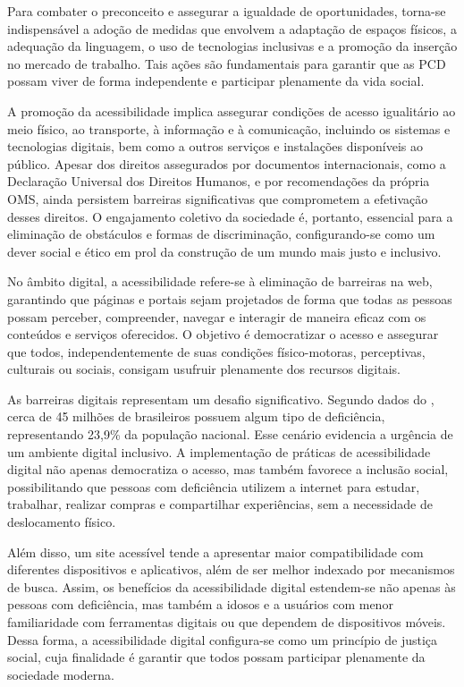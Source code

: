 Para combater o preconceito e assegurar a igualdade de oportunidades, torna-se indispensável a adoção de medidas que envolvem a adaptação de espaços físicos, a adequação da linguagem, o uso de tecnologias inclusivas e a promoção da inserção no mercado de trabalho. Tais ações são fundamentais para garantir que as PCD possam viver de forma independente e participar plenamente da vida social.

A promoção da acessibilidade implica assegurar condições de acesso igualitário ao meio físico, ao transporte, à informação e à comunicação, incluindo os sistemas e tecnologias digitais, bem como a outros serviços e instalações disponíveis ao público. Apesar dos direitos assegurados por documentos internacionais, como a Declaração Universal dos Direitos Humanos, e por recomendações da própria OMS, ainda persistem barreiras significativas que comprometem a efetivação desses direitos. O engajamento coletivo da sociedade é, portanto, essencial para a eliminação de obstáculos e formas de discriminação, configurando-se como um dever social e ético em prol da construção de um mundo mais justo e inclusivo.

No âmbito digital, a acessibilidade refere-se à eliminação de barreiras na web, garantindo que páginas e portais sejam projetados de forma que todas as pessoas possam perceber, compreender, navegar e interagir de maneira eficaz com os conteúdos e serviços oferecidos. O objetivo é democratizar o acesso e assegurar que todos, independentemente de suas condições físico-motoras, perceptivas, culturais ou sociais, consigam usufruir plenamente dos recursos digitais.

As barreiras digitais representam um desafio significativo. Segundo dados do \textcite{IBGE2010}, cerca de 45 milhões de brasileiros possuem algum tipo de deficiência, representando 23,9\% da população nacional. Esse cenário evidencia a urgência de um ambiente digital inclusivo. A implementação de práticas de acessibilidade digital não apenas democratiza o acesso, mas também favorece a inclusão social, possibilitando que pessoas com deficiência utilizem a internet para estudar, trabalhar, realizar compras e compartilhar experiências, sem a necessidade de deslocamento físico.

Além disso, um site acessível tende a apresentar maior compatibilidade com diferentes dispositivos e aplicativos, além de ser melhor indexado por mecanismos de busca. Assim, os benefícios da acessibilidade digital estendem-se não apenas às pessoas com deficiência, mas também a idosos e a usuários com menor familiaridade com ferramentas digitais ou que dependem de dispositivos móveis. Dessa forma, a acessibilidade digital configura-se como um princípio de justiça social, cuja finalidade é garantir que todos possam participar plenamente da sociedade moderna.

